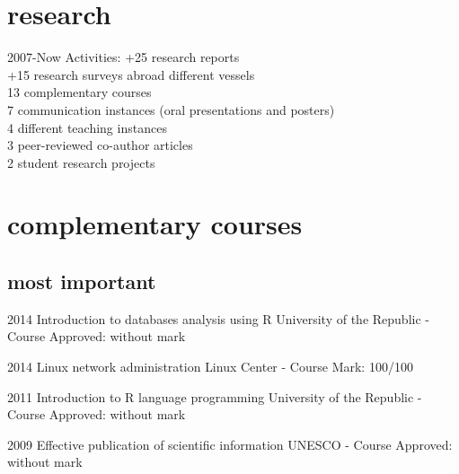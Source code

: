 \documentclass[]{friggeri-cv} %
\begin{document}
\section{research}
\begin{entrylist}
\entry 
{2007-Now}
{Activities:}
{}
{+25 research reports\\
	+15 research surveys abroad different vessels\\
	13 complementary courses\\
	7 communication instances (oral presentations and posters)\\
	4 different teaching instances\\
	3 peer-reviewed co-author articles\\
	2 student research projects
	}
\end{entrylist}


\section{complementary courses}

\subsection{most important}

\begin{entrylist}

	\entry
	{2014}	
	{Introduction to databases analysis using R}
	{University of the Republic - Course}
	{Approved: without mark}

	\entry
	{2014}	
	{Linux network administration}
	{Linux Center - Course}
	{Mark: 100/100}
	
	\entry
	{2011}	
	{Introduction to R language programming}
	{University of the Republic - Course}
	{Approved: without mark}
	
	\entry
	{2009}	
	{Effective publication of scientific information}
	{UNESCO - Course}
	{Approved: without mark}

\end{entrylist}
\end{document}
